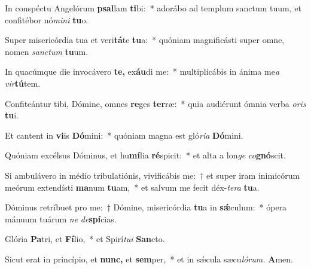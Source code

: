 \item In conspéctu Angelórum \textbf{psal}lam \textbf{ti}bi:~* adorábo ad templum sanctum tuum, et confitébor nó\textit{mini} \textbf{tu}o.
\item Super misericórdia tua et veri\textbf{tá}te \textbf{tu}a:~* quóniam magnificásti super omne, nomen \textit{sanctum} \textbf{tu}um.
\item In quacúmque die invocávero \textbf{te,} ex\textbf{áu}di me:~* multiplicábis in ánima me\tinyhspace\textit{a} \textit{vir}\textbf{tú}tem.
\item Confiteántur tibi, Dómine, omnes \textbf{re}ges \textbf{ter}ræ:~* quia audiérunt ómnia verba \textit{oris} \textbf{tu}i.
\item Et cantent in \textbf{vi}is \textbf{Dó}mini:~* quóniam magna est gló\textit{ria} \textbf{Dó}mini.
\item Quóniam excélsus Dóminus, et hu\textbf{mí}lia \textbf{ré}spicit:~* et alta a lon\textit{ge} \textit{co}\textbf{gnó}scit.
\item Si ambulávero in médio tribulatiónis, vivificábis me:~† et super iram inimicórum meórum extendísti \textbf{ma}num \textbf{tu}am,~* et salvum me fecit 
déx-\textit{tera} \textbf{tu}a.
\item Dóminus retríbuet pro me:~† Dómine, misericórdia \textbf{tu}a in \textbf{sǽ}culum:~* ópera mánuum tuárum \textit{ne} \textit{de}\textbf{spí}cias.
\item Glória \textbf{Pa}tri, et \textbf{Fí}lio,~* et Spirí\tinyhspace\textit{tui} \textbf{San}cto.
\item Sicut erat in princípio, et \textbf{nunc,} et \textbf{sem}per,~* et in sǽcula sæcu\tinyhspace\textit{lórum.} \textbf{A}men.